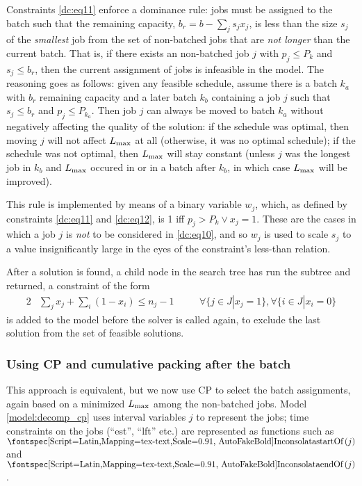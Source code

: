 Constraints \eqref{dc:eq11} enforce a dominance rule: jobs must be assigned to
the batch such that the remaining capacity, $b_r = b - \sum_j s_j x_j$, is less
than the size $s_j$ of the \textit{smallest} job from the set of non-batched
jobs that are \textit{not longer} than the current batch. That is, if there
exists an non-batched job $j$ with $p_j \leq P_k$ and $s_j \leq b_r$, then the
current assignment of jobs is infeasible in the model. The reasoning goes as
follows: given any feasible schedule, assume there is a batch $k_a$ with $b_r$
remaining capacity and a later batch $k_b$ containing a job $j$ such that $s_j
\leq b_r$ and $p_j \leq P_{k_a}$. Then job $j$ can always be moved to batch
$k_a$ without negatively affecting the quality of the solution: if the schedule
was optimal, then moving $j$ will not affect $L_{\text{max}}$ at all (otherwise, it was
no optimal schedule); if the schedule was not optimal, then $L_{\text{max}}$ will stay
constant (unless $j$ was the longest job in $k_b$ and $L_{\text{max}}$ occured in or in a
batch after $k_b$, in which case $L_{\text{max}}$ will be improved).

This rule is implemented by means of a binary variable $w_j$, which, as defined
by constraints \eqref{dc:eq11} and \eqref{dc:eq12}, is 1 iff $p_j > P_k \lor x_j
= 1$. These are the cases in which a job $j$ is \textit{not} to be considered in
\eqref{dc:eq10}, and so $w_j$ is used to scale $s_j$ to a value insignificantly
large in the eyes of the constraint's less-than relation.

After a solution is found, a child node in the search tree has run the subtree
and returned, a constraint of the form 
\begin{alignat}{2}
& \sum_j x_j + \sum_i (1-x_i) \leq n_j - 1 \quad && \forall \{j \in J | x_j =
1\}, \forall \{i \in J | x_i = 0 \}
\end{alignat}
is added to the model before the solver is called again, to exclude the last
solution from the set of feasible solutions. 

\subsubsection{Using CP and cumulative packing after the
batch}\label{sec:cpdecomp}
This approach is equivalent, but we now use CP to select the batch assignments,
again based on a minimized $L_{\text{max}}$ among the non-batched jobs. Model
\ref{model:decomp_cp} uses interval variables $j$ to represent the jobs;
time constraints on the jobs (``est'', ``lft'' etc.) are represented as
functions such as $\startOf(j)$ and $\endOf(j)$.

